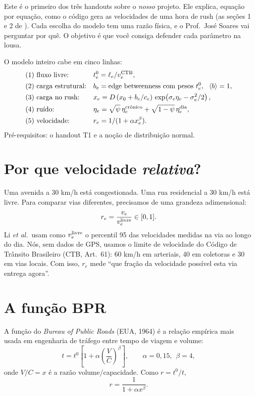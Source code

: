 \documentclass[11pt]{article}
\begin{document}
\fazertitulo

Este é o primeiro dos três handouts sobre o \emph{nosso} projeto. Ele explica, equação por equação, como o código gera as velocidades de uma hora de rush (as seções 1 e 2 de ). Cada escolha do modelo tem uma razão física, e o Prof.\ José Soares vai perguntar por quê. O objetivo é que você consiga defender cada parâmetro na lousa.

O modelo inteiro cabe em cinco linhas:
\begin{align*}
&\text{(1) fluxo livre:} && t_e^0 = \ell_e/v_e^{\rm CTB},\\
&\text{(2) carga estrutural:} && b_e = \text{edge betweenness com pesos } t^0_e,\ \ \left\langle b \right\rangle = 1,\\
&\text{(3) carga no rush:} && x_e = D\,(x_0 + b_e/c_e)\,\exp\!\left(\sigma_e\eta_e-\sigma_e^2/2\right),\\
&\text{(4) ruído:} && \eta_e = \sqrt\psi\,\eta_e^{\text{crônico}}+\sqrt{1-\psi}\,\eta_e^{\rm dia},\\
&\text{(5) velocidade:} && r_e = 1/(1+\alpha x_e^\beta).
\end{align*}
Pré-requisitos: o handout T1 e a noção de distribuição normal. 

\section{Por que velocidade \emph{relativa}?}

Uma avenida a 30 km/h está congestionada. Uma rua residencial a 30 km/h está livre. Para comparar vias diferentes, precisamos de uma grandeza adimensional:
\[
r_e = \frac{v_e}{v_e^{\rm livre}}\in[0,1].
\]
Li \emph{et al.}\ usam como $v_e^{\rm livre}$ o percentil 95 das velocidades medidas na via ao longo do dia. Nós, sem dados de GPS, usamos o limite de velocidade do Código de Trânsito Brasileiro (CTB, Art.\ 61): 60 km/h em arteriais, 40 em coletoras e 30 em vias locais. Com isso, $r_e$ mede ``que fração da velocidade possível esta via entrega agora''.

\section{A função BPR}

\begin{ideia}
A função do \emph{Bureau of Public Roads} (EUA, 1964) é a relação empírica mais usada em engenharia de tráfego entre tempo de viagem e volume:
\[
t = t^0\left[1+\alpha\left(\frac VC\right)^{\!\beta}\right],\qquad \alpha = 0{,}15,\ \ \beta = 4,
\]
onde $V/C = x$ é a razão volume/capacidade. Como $r = t^0/t$,
\[
r = \frac{1}{1+\alpha x^\beta}.
\]
\end{ideia}
\end{document}
